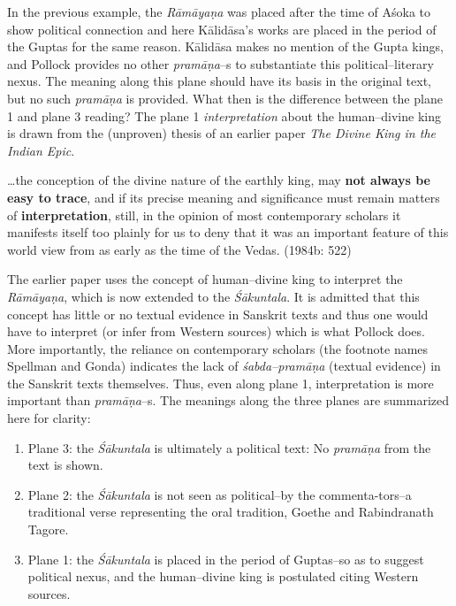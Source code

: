 In the previous example, the \textit{Rāmāyaṇa} was placed after the time of Aśoka to show political connection and here Kālidāsa’s works are placed in the period of the Guptas for the same reason. Kālidāsa makes no mention of the Gupta kings, and Pollock provides no other \textit{pramāṇa}–s to substantiate this political–literary nexus. The meaning along this plane should have its basis in the original text, but no such \textit{pramāṇa} is provided. What then is the difference between the plane 1 and plane 3 reading? The plane 1 \textit{interpretation} about the human–divine king is drawn from the (unproven) thesis of an earlier paper \textit{The Divine King in the Indian Epic}.

\begin{myquote}
…the conception of the divine nature of the earthly king, may \textbf{not always be easy to trace}, and if its precise meaning and significance must remain matters of \textbf{interpretation}, still, in the opinion of most contemporary scholars it manifests itself too plainly for us to deny that it was an important feature of this world view from as early as the time of the Vedas. (1984b: 522)
\end{myquote}

The earlier paper uses the concept of human–divine king to interpret the \textit{Rāmāyaṇa}, which is now extended to the \textit{Śākuntala}. It is admitted that this concept has little or no textual evidence in Sanskrit texts and thus one would have to interpret (or infer from Western sources) which is what Pollock does. More importantly, the reliance on contemporary scholars (the footnote names Spellman and Gonda) indicates the lack of \textit{śabda–pramāṇa} (textual evidence) in the Sanskrit texts themselves. Thus, even along plane 1, interpretation is more important than \textit{pramāṇa}–s. The meanings along the three planes are summarized here for clarity:

\newpage

\begin{enumerate}
\itemsep=0pt
\item Plane 3: the \textit{Śākuntala} is ultimately a political text: No \textit{pramāṇa} from the text is shown.

 \item Plane 2: the \textit{Śākuntala} is not seen as political–by the commenta-\break tors–a traditional verse representing the oral tradition, Goethe and Rabindranath Tagore.

 \item Plane 1: the \textit{Śākuntala} is placed in the period of Guptas–so as to suggest political nexus, and the human–divine king is postulated citing Western sources.

\end{enumerate}

